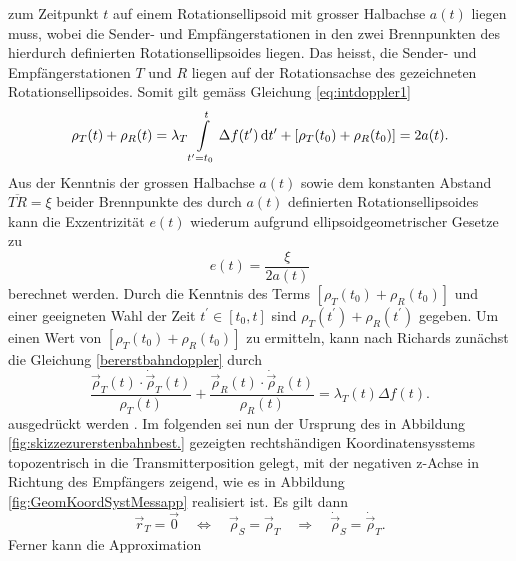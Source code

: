 \documentclass[a4paper,12pt]{article}
\numberwithin{equation}{section}
\begin{document}
zum Zeitpunkt $t$ auf einem Rotationsellipsoid mit grosser Halbachse $a(t)$ liegen muss, wobei die Sender- und Empfängerstationen in den zwei Brennpunkten des hierdurch definierten Rotationsellipsoides liegen. Das heisst, die Sender- und Empfängerstationen $T$ und $R$ liegen auf der Rotationsachse des gezeichneten Rotationsellipsoides. Somit gilt gemäss Gleichung \eqref{eq:intdoppler1} \begin{equation}\label{eq:intdoppler2}
\rho_T(t) + \rho_R(t) = \lambda_T\int\displaylimits_{t^\prime = t_0}^{t} \Delta f(t^\prime) \, \mathrm{d}t^\prime + [\rho_T(t_0)+\rho_R(t_0)] = 2a(t).
\end{equation} Aus der Kenntnis der grossen Halbachse $a(t)$ sowie dem konstanten Abstand $\overline{TR} = \xi$ beider Brennpunkte des durch $a(t)$ definierten Rotationsellipsoides kann die Exzentrizität $e(t)$ wiederum aufgrund ellipsoidgeometrischer Gesetze zu \begin{equation}
e(t) = \frac{\xi}{2a(t)}
\end{equation} berechnet werden. Durch die Kenntnis des Terms $[\rho_T(t_0)+\rho_R(t_0)]$ und einer geeigneten Wahl der Zeit $t^\prime \in [t_0,t]$ sind $\rho_T(t^\prime) + \rho_R(t^\prime)$ gegeben. Um einen Wert von $[\rho_T(t_0)+\rho_R(t_0)]$ zu ermitteln, kann nach Richards zunächst die Gleichung \eqref{bererstbahndoppler} durch \begin{equation}\label{eq:vereinfachdurchanntopozundniedrflughoehe}
\frac{\vec{\rho}_T(t) \cdot \dot{\vec{\rho}}_T(t)}{\rho_T(t)} + \frac{\vec{\rho}_R(t) \cdot \dot{\vec{\rho}}_R(t)}{\rho_R(t)} = \lambda_T(t)\Delta f(t).
\end{equation} ausgedrückt werden \cite[S.1730]{Richards.1961}.
Im folgenden sei nun der Ursprung des in Abbildung \ref{fig:skizzezurerstenbahnbest.} gezeigten rechtshändigen Koordinatensysstems topozentrisch in die Transmitterposition gelegt, mit der negativen z-Achse in Richtung des Empfängers zeigend, wie es in Abbildung \ref{fig:GeomKoordSystMessapp} realisiert ist. Es gilt dann \begin{equation}
\vec{r}_T = \vec{0} \quad \Leftrightarrow \quad \vec{\rho}_{S} = \vec{\rho}_T \quad \Rightarrow \quad \dot{\vec{\rho}}_S = \dot{\vec{\rho}}_T.
\end{equation} Ferner kann die Approximation
\end{document}
